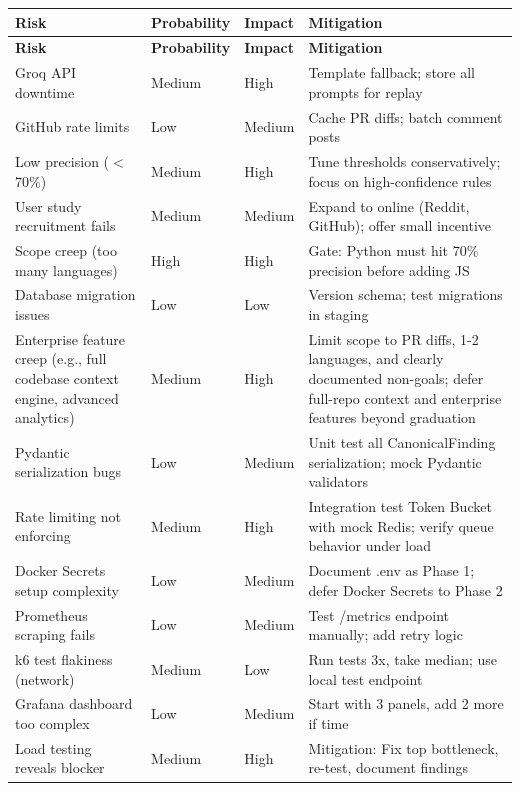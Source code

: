 \documentclass[11pt,a4paper]{article}
\begin{document}
\begin{longtable}{p{3.5cm}p{2cm}p{2cm}p{6cm}}
\toprule
\textbf{Risk} & \textbf{Probability} & \textbf{Impact} & \textbf{Mitigation} \\
\midrule
\endfirsthead
\toprule
\textbf{Risk} & \textbf{Probability} & \textbf{Impact} & \textbf{Mitigation} \\
\midrule
\endhead
Groq API downtime & Medium & High & Template fallback; store all prompts for replay \\
\midrule
GitHub rate limits & Low & Medium & Cache PR diffs; batch comment posts \\
\midrule
Low precision ($<$70\%) & Medium & High & Tune thresholds conservatively; focus on high-confidence rules \\
\midrule
User study recruitment fails & Medium & Medium & Expand to online (Reddit, GitHub); offer small incentive \\
\midrule
Scope creep (too many languages) & High & High & Gate: Python must hit 70\% precision before adding JS \\
\midrule
Database migration issues & Low & Low & Version schema; test migrations in staging \\
\midrule
Enterprise feature creep (e.g., full codebase context engine, advanced analytics) & Medium & High & Limit scope to PR diffs, 1-2 languages, and clearly documented non-goals; defer full-repo context and enterprise features beyond graduation \\
\midrule
Pydantic serialization bugs & Low & Medium & Unit test all CanonicalFinding serialization; mock Pydantic validators \\
\midrule
Rate limiting not enforcing & Medium & High & Integration test Token Bucket with mock Redis; verify queue behavior under load \\
\midrule
Docker Secrets setup complexity & Low & Medium & Document .env as Phase 1; defer Docker Secrets to Phase 2 \\
\midrule
Prometheus scraping fails & Low & Medium & Test /metrics endpoint manually; add retry logic \\
\midrule
k6 test flakiness (network) & Medium & Low & Run tests 3x, take median; use local test endpoint \\
\midrule
Grafana dashboard too complex & Low & Medium & Start with 3 panels, add 2 more if time \\
\midrule
Load testing reveals blocker & Medium & High & Mitigation: Fix top bottleneck, re-test, document findings \\

\end{longtable}
\end{document}

